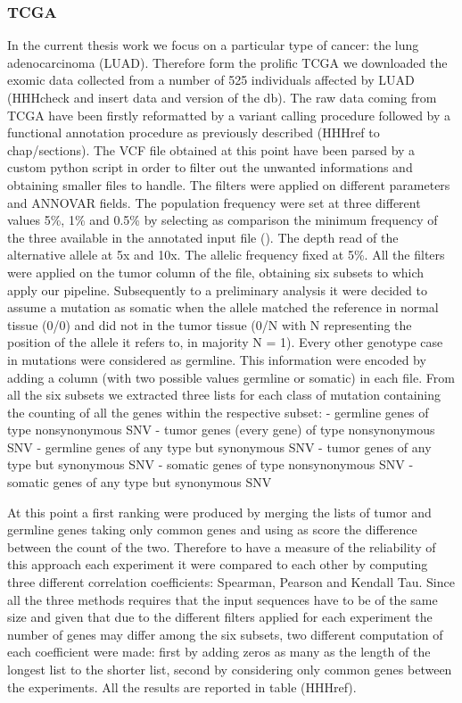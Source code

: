 \subsubsection{TCGA}
In the current thesis work we focus on a particular type of cancer: the lung adenocarcinoma (LUAD). Therefore form the prolific TCGA we downloaded the exomic data collected from a number of 525 individuals affected by LUAD (HHHcheck and insert data and version of the db). The raw data coming from TCGA have been firstly reformatted by a variant calling procedure followed by a functional annotation procedure as previously described (HHHref to chap/sections).
The VCF file obtained at this point have been parsed by a custom python script in order to filter out the unwanted informations and obtaining smaller files to handle. The filters were applied on different parameters and ANNOVAR fields. The population frequency were set at three different values 5\%, 1\% and 0.5\% by selecting as comparison the minimum frequency of the three available in the annotated input file (). The depth read of the alternative allele at 5x and 10x. The allelic frequency fixed at 5\%. All the filters were applied on the tumor column of the file, obtaining six subsets to which apply our pipeline. 
Subsequently to a preliminary analysis it were decided to assume a mutation as somatic when the allele matched the reference in normal tissue (0/0) and did not in the tumor tissue (0/N with N representing the position of the allele it refers to, in majority N = 1). Every other genotype case in mutations were considered as germline. This information were encoded by adding a column (with two possible values germline or somatic) in each file.
From all the six subsets we extracted three lists for each class of mutation containing the counting of all the genes within the respective subset:
- germline genes of type nonsynonymous SNV
- tumor genes (every gene) of type nonsynonymous SNV
- germline genes of any type but synonymous SNV
- tumor genes of any type but synonymous SNV
- somatic genes of type nonsynonymous SNV
- somatic genes of any type but synonymous SNV


At this point a first ranking were produced by merging the lists of tumor and germline genes taking only common genes and using as score the difference between the count of the two. Therefore to have a measure of the reliability of this approach each experiment it were compared to each other by computing three different correlation coefficients: Spearman, Pearson and Kendall Tau. Since all the three methods requires that the input sequences have to be of the same size and given that due to the different filters applied for each experiment the number of genes may differ among the six subsets, two different computation of each coefficient were made: first by adding zeros as many as the length of the longest list to the shorter list, second by considering only common genes between the experiments. All the results are reported in table (HHHref).


